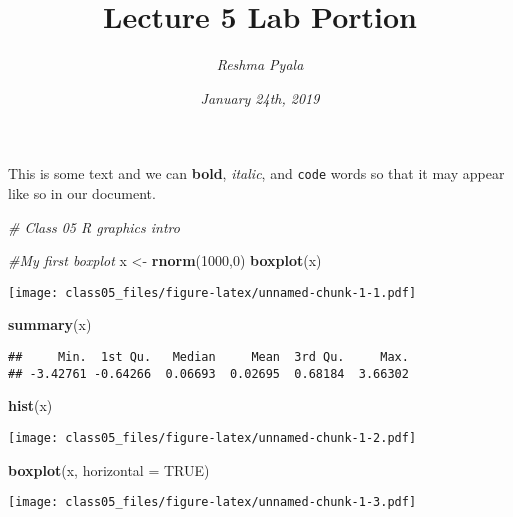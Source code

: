 \documentclass[]{article}
\title{Lecture 5 Lab Portion}
\author{\emph{Reshma Pyala}}
\date{\emph{January 24th, 2019}}
\newenvironment{Shaded}{\begin{snugshade}}{\end{snugshade}}
\newcommand{\KeywordTok}[1]{\textcolor[rgb]{0.13,0.29,0.53}{\textbf{#1}}}
\newcommand{\DataTypeTok}[1]{\textcolor[rgb]{0.13,0.29,0.53}{#1}}
\newcommand{\DecValTok}[1]{\textcolor[rgb]{0.00,0.00,0.81}{#1}}
\newcommand{\StringTok}[1]{\textcolor[rgb]{0.31,0.60,0.02}{#1}}
\newcommand{\CommentTok}[1]{\textcolor[rgb]{0.56,0.35,0.01}{\textit{#1}}}
\newcommand{\OtherTok}[1]{\textcolor[rgb]{0.56,0.35,0.01}{#1}}
\newcommand{\NormalTok}[1]{#1}
\begin{document}
\maketitle

This is some text and we can \textbf{bold}, \emph{italic}, and
\texttt{code} words so that it may appear like so in our document.

\begin{Shaded}
\begin{Highlighting}[]
\CommentTok{# Class 05 R graphics intro}

\CommentTok{#My first boxplot}
\NormalTok{x <-}\StringTok{ }\KeywordTok{rnorm}\NormalTok{(}\DecValTok{1000}\NormalTok{,}\DecValTok{0}\NormalTok{)}
\KeywordTok{boxplot}\NormalTok{(x)}
\end{Highlighting}
\end{Shaded}

\texttt{[image: class05\_files/figure-latex/unnamed-chunk-1-1.pdf]}

\begin{Shaded}
\begin{Highlighting}[]
\KeywordTok{summary}\NormalTok{(x)}
\end{Highlighting}
\end{Shaded}

\begin{verbatim}
##     Min.  1st Qu.   Median     Mean  3rd Qu.     Max. 
## -3.42761 -0.64266  0.06693  0.02695  0.68184  3.66302
\end{verbatim}

\begin{Shaded}
\begin{Highlighting}[]
\KeywordTok{hist}\NormalTok{(x)}
\end{Highlighting}
\end{Shaded}

\texttt{[image: class05\_files/figure-latex/unnamed-chunk-1-2.pdf]}

\begin{Shaded}
\begin{Highlighting}[]
\KeywordTok{boxplot}\NormalTok{(x, }\DataTypeTok{horizontal =} \OtherTok{TRUE}\NormalTok{)}
\end{Highlighting}
\end{Shaded}

\texttt{[image: class05\_files/figure-latex/unnamed-chunk-1-3.pdf]}
\end{document}
